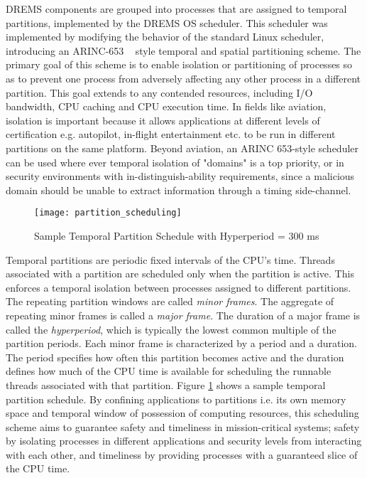 DREMS components are grouped into processes that are assigned to temporal partitions, implemented by the DREMS OS scheduler. This scheduler was implemented by modifying the behavior of the standard Linux scheduler, introducing an ARINC-653 ~\cite{ARINC-653} style temporal and spatial partitioning scheme. The primary goal of this scheme is to enable isolation or partitioning of processes so as to prevent one process from adversely affecting any other process in a different partition. This goal extends to any contended resources, including I/O bandwidth, CPU caching and CPU execution time. In fields like aviation, isolation is important because it allows applications at different levels of certification e.g. autopilot, in-flight entertainment etc. to be run in different partitions on the same platform. Beyond aviation, an ARINC 653-style scheduler can be used where ever temporal isolation of "domains" is a top priority, or in security environments with in-distinguish-ability requirements, since a malicious domain should be unable to extract information through a timing side-channel.  

\begin{figure}[ht]
	\centering
	\texttt{[image: partition\_scheduling]}
	\caption{Sample Temporal Partition Schedule with Hyperperiod = 300 ms}
	\label{fig:partition_scheduling}
\end{figure}


Temporal partitions are periodic fixed intervals of the CPU's time. Threads associated with a partition are scheduled only when the partition is active. This enforces a temporal isolation between processes assigned to different partitions. The repeating partition windows are called \emph{minor frames}. The aggregate of repeating minor frames is called a \emph{major frame}. The duration of a major frame is called the \emph{hyperperiod}, which is typically the lowest common multiple of the partition periods. Each minor frame is characterized by a period and a duration. The period specifies how often this partition becomes active and the duration defines how much of the CPU time is available for scheduling the runnable threads associated with that partition. Figure \ref{fig:partition_scheduling} shows a sample temporal partition schedule. By confining applications to partitions i.e. its own memory space and temporal window of possession of computing resources, this scheduling scheme aims to guarantee safety and timeliness in mission-critical systems; safety by isolating processes in different applications and security levels from interacting with each other, and timeliness by providing processes with a guaranteed slice of the CPU time. 
 

